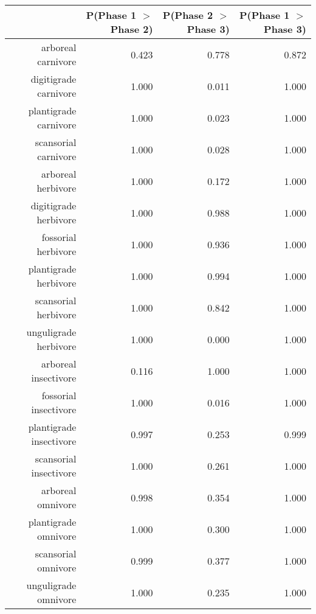 \begin{table}[ht]
\centering
\begin{tabular}{rrrr}
  \hline
 & P(Phase 1 $>$ Phase 2) & P(Phase 2 $>$ Phase 3) & P(Phase 1 $>$ Phase 3) \\ 
  \hline
arboreal carnivore & 0.423 & 0.778 & 0.872 \\ 
  digitigrade carnivore & 1.000 & 0.011 & 1.000 \\ 
  plantigrade carnivore & 1.000 & 0.023 & 1.000 \\ 
  scansorial carnivore & 1.000 & 0.028 & 1.000 \\ 
  arboreal herbivore & 1.000 & 0.172 & 1.000 \\ 
  digitigrade herbivore & 1.000 & 0.988 & 1.000 \\ 
  fossorial herbivore & 1.000 & 0.936 & 1.000 \\ 
  plantigrade herbivore & 1.000 & 0.994 & 1.000 \\ 
  scansorial herbivore & 1.000 & 0.842 & 1.000 \\ 
  unguligrade herbivore & 1.000 & 0.000 & 1.000 \\ 
  arboreal insectivore & 0.116 & 1.000 & 1.000 \\ 
  fossorial insectivore & 1.000 & 0.016 & 1.000 \\ 
  plantigrade insectivore & 0.997 & 0.253 & 0.999 \\ 
  scansorial insectivore & 1.000 & 0.261 & 1.000 \\ 
  arboreal omnivore & 0.998 & 0.354 & 1.000 \\ 
  plantigrade omnivore & 1.000 & 0.300 & 1.000 \\ 
  scansorial omnivore & 0.999 & 0.377 & 1.000 \\ 
  unguligrade omnivore & 1.000 & 0.235 & 1.000 \\ 
   \hline
\end{tabular}
\label{tab:origin_plant}
\end{table}
